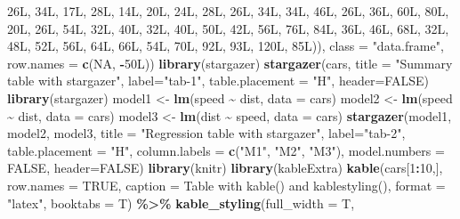 \documentclass[
  12pt,
]{article}
\newenvironment{Shaded}{\begin{snugshade}}{\end{snugshade}}
\newcommand{\AttributeTok}[1]{\textcolor[rgb]{0.13,0.29,0.53}{#1}}
\newcommand{\ConstantTok}[1]{\textcolor[rgb]{0.56,0.35,0.01}{#1}}
\newcommand{\DecValTok}[1]{\textcolor[rgb]{0.00,0.00,0.81}{#1}}
\newcommand{\FunctionTok}[1]{\textcolor[rgb]{0.13,0.29,0.53}{\textbf{#1}}}
\newcommand{\NormalTok}[1]{#1}
\newcommand{\OtherTok}[1]{\textcolor[rgb]{0.56,0.35,0.01}{#1}}
\newcommand{\SpecialCharTok}[1]{\textcolor[rgb]{0.81,0.36,0.00}{\textbf{#1}}}
\newcommand{\StringTok}[1]{\textcolor[rgb]{0.31,0.60,0.02}{#1}}
\begin{document}
\begin{Shaded}
\begin{Highlighting}[]
\NormalTok{26L, 34L, 17L, 28L, 14L, 20L, 24L, 28L, 26L, 34L, 34L, 46L, 26L, }
\NormalTok{36L, 60L, 80L, 20L, 26L, 54L, 32L, 40L, 32L, 40L, 50L, 42L, 56L, }
\NormalTok{76L, 84L, 36L, 46L, 68L, 32L, 48L, 52L, 56L, 64L, 66L, 54L, 70L, }
\NormalTok{92L, 93L, 120L, 85L)), }
\AttributeTok{class =} \StringTok{"data.frame"}\NormalTok{, }\AttributeTok{row.names =} \FunctionTok{c}\NormalTok{(}\ConstantTok{NA}\NormalTok{, }
\SpecialCharTok{{-}}\NormalTok{50L))}
\FunctionTok{library}\NormalTok{(stargazer)}
\FunctionTok{stargazer}\NormalTok{(cars, }
          \AttributeTok{title =} \StringTok{"Summary table with stargazer"}\NormalTok{,}
          \AttributeTok{label=}\StringTok{"tab{-}1"}\NormalTok{, }
          \AttributeTok{table.placement =} \StringTok{"H"}\NormalTok{, }
          \AttributeTok{header=}\ConstantTok{FALSE}\NormalTok{)}
\FunctionTok{library}\NormalTok{(stargazer)}
\NormalTok{model1 }\OtherTok{\textless{}{-}} \FunctionTok{lm}\NormalTok{(speed }\SpecialCharTok{\textasciitilde{}}\NormalTok{ dist, }\AttributeTok{data =}\NormalTok{ cars)}
\NormalTok{model2 }\OtherTok{\textless{}{-}} \FunctionTok{lm}\NormalTok{(speed }\SpecialCharTok{\textasciitilde{}}\NormalTok{ dist, }\AttributeTok{data =}\NormalTok{ cars)}
\NormalTok{model3 }\OtherTok{\textless{}{-}} \FunctionTok{lm}\NormalTok{(dist }\SpecialCharTok{\textasciitilde{}}\NormalTok{ speed, }\AttributeTok{data =}\NormalTok{ cars)}
\FunctionTok{stargazer}\NormalTok{(model1, model2, model3,}
          \AttributeTok{title =} \StringTok{"Regression table with stargazer"}\NormalTok{,}
          \AttributeTok{label=}\StringTok{"tab{-}2"}\NormalTok{, }
          \AttributeTok{table.placement =} \StringTok{"H"}\NormalTok{, }
          \AttributeTok{column.labels =} \FunctionTok{c}\NormalTok{(}\StringTok{"M1"}\NormalTok{, }\StringTok{"M2"}\NormalTok{, }\StringTok{"M3"}\NormalTok{),}
          \AttributeTok{model.numbers =} \ConstantTok{FALSE}\NormalTok{,}
          \AttributeTok{header=}\ConstantTok{FALSE}\NormalTok{)}
\FunctionTok{library}\NormalTok{(knitr)}
\FunctionTok{library}\NormalTok{(kableExtra)}
\FunctionTok{kable}\NormalTok{(cars[}\DecValTok{1}\SpecialCharTok{:}\DecValTok{10}\NormalTok{,], }\AttributeTok{row.names =} \ConstantTok{TRUE}\NormalTok{, }
      \AttributeTok{caption =} \StringTok{\textquotesingle{}Table with kable() and kablestyling()\textquotesingle{}}\NormalTok{, }
      \AttributeTok{format =} \StringTok{"latex"}\NormalTok{, }\AttributeTok{booktabs =}\NormalTok{ T) }\SpecialCharTok{\%\textgreater{}\%}
        \FunctionTok{kable\_styling}\NormalTok{(}\AttributeTok{full\_width =}\NormalTok{ T, }

\end{Highlighting}
\end{Shaded}
\end{document}
